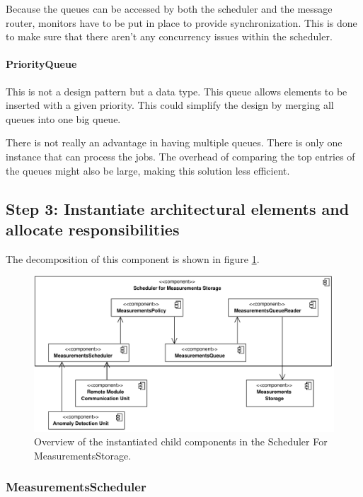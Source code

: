\npar Because the queues can be accessed by both the scheduler and the message
router, monitors have to be put in place to provide synchronization. This is
done to make sure that there aren't any concurrency issues within the scheduler. 

\paragraph{PriorityQueue}

\npar This is not a design pattern but a data type. This queue allows elements
to be inserted with a given priority. This could simplify the design by merging
all queues into one big queue.

\npar There is not really an advantage in having multiple queues. There is only
one instance that can process the jobs. The overhead of comparing the top
entries of the queues might also be large, making this solution less efficient. 

\subsection{Step 3: Instantiate architectural elements and allocate responsibilities}
\label{add:it3/elements}

\npar The decomposition of this component is shown in figure
\ref{fig:it3/elements}. 

\begin{figure}[H]
	\begin{centering}
		\includegraphics[width=\textwidth]{figs/add-it3-elements.pdf}
		\caption{Overview of the instantiated child components in the Scheduler For
		MeasurementsStorage.}
		\label{fig:it3/elements}
	\end{centering}
\end{figure}

\subsubsection{MeasurementsScheduler}

